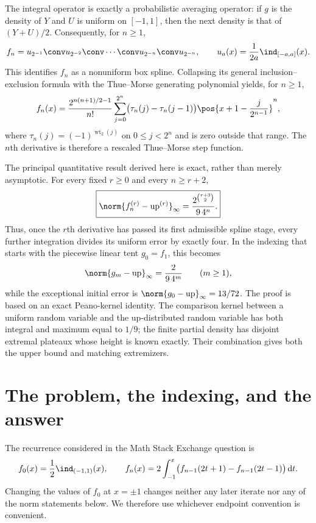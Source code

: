 \documentclass[11pt,oneside]{article}
\theoremstyle{definition}
\theoremstyle{remark}
\newcommand{\Up}{\operatorname{up}}
\newcommand{\wt}{\operatorname{wt}_2}
\newcommand{\dd}{\,\mathrm d}
\begin{document}
The integral operator is exactly a probabilistic averaging operator: if $g$ is the density
of $Y$ and $U$ is uniform on $[-1,1]$, then the next density is that of $(Y+U)/2$.
Consequently, for $n\ge1$,
\[
 f_n=u_{2^{-1}}\conv u_{2^{-2}}\conv\cdots\conv u_{2^{-n}}\conv u_{2^{-n}},
 \qquad
 u_a(x)=\frac1{2a}\ind_{[-a,a]}(x).
\]
This identifies $f_n$ as a nonuniform box spline.  Collapsing its general
inclusion--exclusion formula with the Thue--Morse generating polynomial yields, for
$n\ge1$,
\[
 f_n(x)=\frac{2^{n(n+1)/2-1}}{n!}
 \sum_{j=0}^{2^n}\bigl(\tau_n(j)-\tau_n(j-1)\bigr)
 \pos{x+1-\frac{j}{2^{n-1}}}^{n},
\]
where $\tau_n(j)=(-1)^{\wt(j)}$ on $0\le j<2^n$ and is zero outside that range.
The $n$th derivative is therefore a rescaled Thue--Morse step function.

The principal quantitative result derived here is exact, rather than merely asymptotic.  For every
fixed $r\ge0$ and every $n\ge r+2$,
\[
 \boxed{\displaystyle
 \norm{f_n^{(r)}-\Up^{(r)}}_\infty
 =\frac{2^{\binom{r+3}{2}}}{9\,4^n}.}
\]
Thus, once the $r$th derivative has passed its first admissible spline stage, every further
integration divides its uniform error by exactly four.  In the indexing that starts with the
piecewise linear tent $g_0=f_1$, this becomes
\[
 \norm{g_m-\Up}_\infty=\frac{2}{9\,4^m}\qquad(m\ge1),
\]
while the exceptional initial error is $\norm{g_0-\Up}_\infty=13/72$.
The proof is based on an exact Peano-kernel identity.  The comparison kernel between a
uniform random variable and the up-distributed random variable has both integral and
maximum equal to $1/9$; the finite partial density has disjoint extremal plateaux whose
height is known exactly.  Their combination gives both the upper bound and matching
extremizers.


\section{The problem, the indexing, and the answer}
\label{repeated2:sec:introduction}

The recurrence considered in the Math Stack Exchange question
\cite{repeated2:mse-question,repeated2:mse-answer} is
\begin{equation}
 f_0(x)=\frac12\ind_{(-1,1)}(x),
 \qquad
 f_n(x)=2\int_{-1}^{x}
 \bigl(f_{n-1}(2t+1)-f_{n-1}(2t-1)\bigr)\dd t.
 \label{repeated2:eq:original-recurrence}
\end{equation}
Changing the values of $f_0$ at $x=\pm1$ changes neither any later iterate nor any of the
norm statements below.  We therefore use whichever endpoint convention is convenient.
\end{document}
